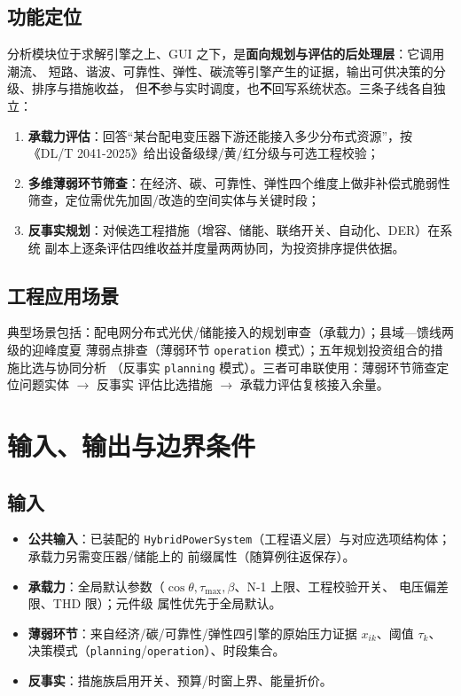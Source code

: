 \documentclass[UTF8,fontset=fandol,a4paper,11pt]{ctexart}
\begin{document}
\subsection{功能定位}
分析模块位于求解引擎之上、GUI 之下，是\textbf{面向规划与评估的后处理层}：它调用潮流、
短路、谐波、可靠性、弹性、碳流等引擎产生的证据，输出可供决策的分级、排序与措施收益，
但\textbf{不}参与实时调度，也\textbf{不}回写系统状态。三条子线各自独立：
\begin{enumerate}
  \item \textbf{承载力评估}：回答“某台配电变压器下游还能接入多少分布式资源”，按
        《DL/T 2041-2025》给出设备级绿/黄/红分级与可选工程校验；
  \item \textbf{多维薄弱环节筛查}：在经济、碳、可靠性、弹性四个维度上做非补偿式脆弱性
        筛查，定位需优先加固/改造的空间实体与关键时段；
  \item \textbf{反事实规划}：对候选工程措施（增容、储能、联络开关、自动化、DER）在系统
        副本上逐条评估四维收益并度量两两协同，为投资排序提供依据。
\end{enumerate}

\subsection{工程应用场景}
典型场景包括：配电网分布式光伏/储能接入的规划审查（承载力）；县域—馈线两级的迎峰度夏
薄弱点排查（薄弱环节 \texttt{operation} 模式）；五年规划投资组合的措施比选与协同分析
（反事实 \texttt{planning} 模式）。三者可串联使用：薄弱环节筛查定位问题实体 $\to$ 反事实
评估比选措施 $\to$ 承载力评估复核接入余量。

\section{输入、输出与边界条件}
\subsection{输入}
\begin{itemize}
  \item \textbf{公共输入}：已装配的 \texttt{HybridPowerSystem}（工程语义层）与对应选项结构体；
        承载力另需变压器/储能上的  前缀属性（随算例往返保存）。
  \item \textbf{承载力}：全局默认参数（$\cos\theta,\tau_{\max},\beta$、N-1 上限、工程校验开关、
        电压偏差限、THD 限）；元件级  属性优先于全局默认。
  \item \textbf{薄弱环节}：来自经济/碳/可靠性/弹性四引擎的原始压力证据 $x_{ik}$、阈值 $\tau_k$、
        决策模式（\texttt{planning}/\texttt{operation}）、时段集合。
  \item \textbf{反事实}：措施族启用开关、预算/时窗上界、能量折价。
\end{itemize}
\end{document}
